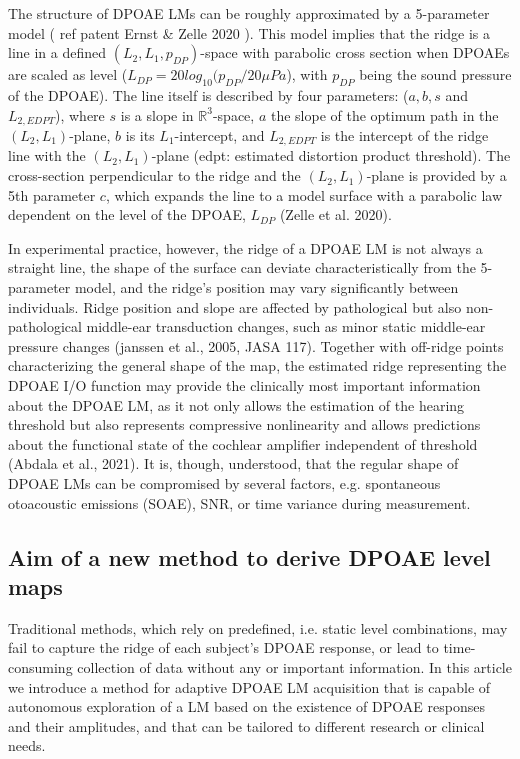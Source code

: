 \documentclass[journal,twoside,web]{ieeecolor2}
\begin{document}
The structure of DPOAE LMs can be roughly approximated by a 5-parameter model ( ref patent Ernst \& Zelle 2020 ).
This model implies that the ridge is a line in a defined $(L_2, L_1, p_{DP})$-space with parabolic cross section when DPOAEs are scaled as level ($L_{DP}=20 log_{10} (p_{DP}/20 \mu Pa$), with $p_{DP}$ being the sound pressure of the DPOAE).
The line itself is described by four parameters: ($a, b, s$ and $L_{2,EDPT}$), where $s$ is a slope in $\mathbb{R}^3$-space, $a$ the slope of the optimum path in the $(L_2, L_1)$-plane, $b$ is its $L_1$-intercept, and $L_{2,EDPT}$ is the intercept of the ridge line with the $(L_2, L_1)$-plane (edpt: estimated distortion product threshold).
The cross-section perpendicular to the ridge and the $(L_2, L_1)$-plane is provided by a 5th parameter $c$, which expands the line to a model surface with a parabolic law dependent on the level of the DPOAE, $L_{DP}$ (Zelle et al. 2020).

In experimental practice, however, the ridge of a DPOAE LM is not always a straight line, the shape of the surface can deviate characteristically from the 5-parameter model, and the ridge’s position may vary significantly between individuals.
Ridge position and slope are affected by pathological but also non-pathological middle-ear transduction changes, such as minor static middle-ear pressure changes (janssen et al., 2005, JASA 117).
Together with off-ridge points characterizing the general shape of the map, the estimated ridge representing the DPOAE I/O function may provide the clinically most important information about the DPOAE LM, as it not only allows the estimation of the hearing threshold but also represents compressive nonlinearity and allows predictions about the functional state of the cochlear amplifier independent of threshold (Abdala et al., 2021).
It is, though, understood, that the regular shape of DPOAE LMs can be compromised by several factors, e.g. spontaneous otoacoustic emissions (SOAE), SNR, or time variance during measurement.

\subsection{Aim of a new method to derive DPOAE level maps}
Traditional methods, which rely on predefined, i.e.
static level combinations, may fail to capture the ridge of each subject’s DPOAE response, or lead to time-consuming collection of data without any or important information.
In this article we introduce a method for adaptive DPOAE LM acquisition that is capable of autonomous exploration of a LM based on the existence of DPOAE responses and their amplitudes, and that can be tailored to different research or clinical needs.
\end{document}
